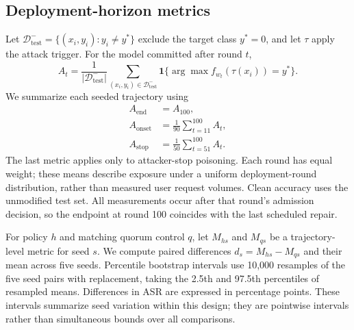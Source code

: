 
\subsection{Deployment-horizon metrics}
Let $\mathcal D^-_{\mathrm{test}}=\{(x_i,y_i):y_i\ne y^*\}$ exclude the target class $y^*=0$, and let $\tau$ apply the attack trigger. For the model committed after round $t$,
\begin{equation}
 A_t=\frac{1}{|\mathcal D^-_{\mathrm{test}}|}
 \sum_{(x_i,y_i)\in\mathcal D^-_{\mathrm{test}}}
 \mathbf1\{\arg\max f_{w_t}(\tau(x_i))=y^*\}.
\end{equation}
We summarize each seeded trajectory using
\begin{align}
 A_{\mathrm{end}}&=A_{100},\\
 A_{\mathrm{onset}}&=\frac1{90}\sum_{t=11}^{100}A_t,\\
 A_{\mathrm{stop}}&=\frac1{50}\sum_{t=51}^{100}A_t.
\end{align}
The last metric applies only to attacker-stop poisoning. Each round has equal weight; these means describe exposure under a uniform deployment-round distribution, rather than measured user request volumes. Clean accuracy uses the unmodified test set. All measurements occur after that round's admission decision, so the endpoint at round 100 coincides with the last scheduled repair.

For policy $h$ and matching quorum control $q$, let $M_{hs}$ and $M_{qs}$ be a trajectory-level metric for seed $s$. We compute paired differences $d_s=M_{hs}-M_{qs}$ and their mean across five seeds. Percentile bootstrap intervals use 10,000 resamples of the five seed pairs with replacement, taking the 2.5th and 97.5th percentiles of resampled means. Differences in ASR are expressed in percentage points. These intervals summarize seed variation within this design; they are pointwise intervals rather than simultaneous bounds over all comparisons.
